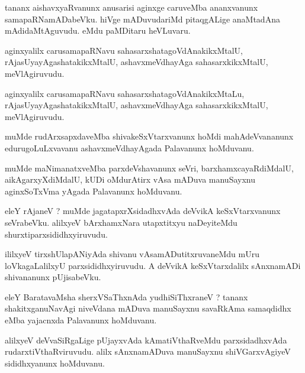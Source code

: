 \documentclass{article}
\begin{document}
\begin{mn}
tananx aishavxyaRvanunx anusarisi aginxge caruveMba ananxvanunx samapaRNamADabeVku. hiVge 
mADuvudariMd pitaqgALige anaMtadAna mAdidaMtAguvudu. eMdu paMDitaru heVLuvaru.
\end{mn}

\begin{mn}
aginxyalilx carusamapaRNavu sahasarxshatagoVdAnakikxMtalU, rAjasUyayAgashatakikxMtalU, 
ashavxmeVdhayAga sahasarxkikxMtalU, meVlAgiruvudu.
\end{mn}

\begin{mn}
aginxyalilx carusamapaRNavu sahasarxshatagoVdAnakikxMtaLu, rAjasUyayAgashatakikxMtalU, 
ashavxmeVdhayAga sahasarxkikxMtalU, meVlAgiruvudu.
\end{mn}

\begin{mn}
muMde rudArxsapxdaveMba shivakeSxVtarxvanunx hoMdi mahAdeVvananunx edurugoLuLxvavanu 
ashavxmeVdhayAgada Palavanunx hoMduvanu.
\end{mn}

\begin{mn}
muMde maNimanatxveMba parxdeVshavanunx seVri, barxhamxcayaRdiMdalU, aikAgarxyXdiMdalU, kUDi 
oMdurAtirx vAsa mADuva manuSayxnu aginxSoTxVma yAgada Palavanunx hoMduvanu.
\end{mn}

\begin{mn}
eleY rAjaneV ? muMde jagatapxrXsidadhxvAda deVvikA keSxVtarxvanunx  seVrabeVku. alilxyeV 
bArxhamxNara utapxtitxyu naDeyiteMdu shurxtiparxsididhxyiruvudu.
\end{mn}

\begin{mn}
ililxyeV tirxshUlapANiyAda shivanu vAsamADutitxruvaneMdu mUru loVkagaLalilxyU parxsididhxyiruvudu.
A deVvikA keSxVtarxdalilx sAnxnamADi shivananunx pUjisabeVku.
\end{mn}

\begin{mn}
eleY BaratavaMsha sherxVSaThxnAda yudhiSiThxraneV ? tananx shakitxganuNavAgi niveVdana mADuva 
manuSayxnu savaRkAma samaqdidhx eMba yajacnxda Palavanunx hoMduvanu.
\end{mn}

\begin{mn}
alilxyeV deVvaSiRgaLige pUjayxvAda kAmatiVthaRveMdu parxsidadhxvAda rudarxtiVthaRviruvudu. alilx 
sAnxnamADuva manuSayxnu shiVGarxvAgiyeV sididhxyanunx hoMduvanu.
\end{mn}
\end{document}
